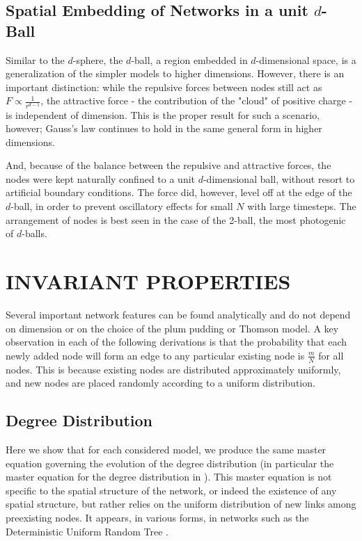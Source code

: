 \documentclass[aps,pre,reprint,superscriptaddress,amsmath,amssymb,nofootinbib]{revtex4-1}
\begin{document}
\subsection{Spatial Embedding of Networks in a unit $d$-Ball}
Similar to the $d$-sphere, the $d$-ball, a region embedded in $d$-dimensional space, is a generalization of the simpler models to higher dimensions.  
However, there is an important distinction: while the repulsive forces between nodes still act as $F \propto \frac{1}{r^{d-1}}$, the attractive force - the contribution of the "cloud" of positive charge - is independent of dimension.  
This is the proper result for such a scenario, however; Gauss's law continues to hold in the same general form in higher dimensions.

And, because of the balance between the repulsive and attractive forces, the nodes were kept naturally confined to a unit $d$-dimensional ball, without resort to artificial boundary conditions.  
The force did, however, level off at the edge of the $d$-ball, in order to prevent oscillatory effects for small $N$ with large timesteps.  
The arrangement of nodes is best seen in the case of the 2-ball, the most photogenic of $d$-balls.  

\section{INVARIANT PROPERTIES}
Several important network features can be found analytically and do not depend on dimension or on the choice of the plum pudding or Thomson model.
A key observation in each of the following derivations is that the probability that each newly added node will form an edge to any particular existing node is $\frac{m}{N}$ for all nodes.
This is because existing nodes are distributed approximately uniformly, and new nodes are placed randomly according to a uniform distribution.

\subsection{Degree Distribution}
Here we show that for each considered model, we produce the same master equation governing the evolution of the degree distribution (in particular the master equation for the degree distribution in \cite{ozik2004}).  
This master equation is not specific to the spatial structure of the network, or indeed the existence of any spatial structure, but rather relies on the uniform distribution of new links among preexisting nodes.  
It appears, in various forms, in networks such as the Deterministic Uniform Random Tree \cite{zhang2008topologies}.
\end{document}
